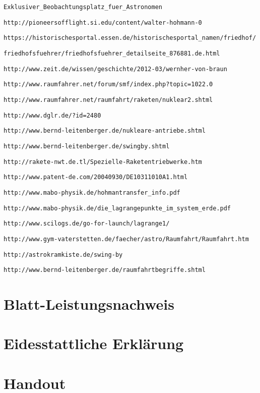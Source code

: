 \documentclass[12pt,a4paper]{article}
\begin{document}
\begin{compactitem}
\verb!Exklusiver_Beobachtungsplatz_fuer_Astronomen!
\item \verb!http://pioneersofflight.si.edu/content/walter-hohmann-0!
\item \verb!https://historischesportal.essen.de/historischesportal_namen/friedhof/!

\verb!friedhofsfuehrer/friedhofsfuehrer_detailseite_876881.de.html!
\item \verb!http://www.zeit.de/wissen/geschichte/2012-03/wernher-von-braun!
\item \verb!http://www.raumfahrer.net/forum/smf/index.php?topic=1022.0!
\item \verb!http://www.raumfahrer.net/raumfahrt/raketen/nuklear2.shtml!
\item \verb!http://www.dglr.de/?id=2480!
\item \verb!http://www.bernd-leitenberger.de/nukleare-antriebe.shtml!
\item \verb!http://www.bernd-leitenberger.de/swingby.shtml!
\item \verb!http://rakete-nwt.de.tl/Spezielle-Raketentriebwerke.htm!
\item \verb!http://www.patent-de.com/20040930/DE10311010A1.html!
\item \verb!http://www.mabo-physik.de/hohmantransfer_info.pdf!
\item \verb!http://www.mabo-physik.de/die_lagrangepunkte_im_system_erde.pdf!
\item \verb!http://www.scilogs.de/go-for-launch/lagrange1/!
\item \verb!http://www.gym-vaterstetten.de/faecher/astro/Raumfahrt/Raumfahrt.htm!
\item \verb!http://astrokramkiste.de/swing-by!
\item \verb!http://www.bernd-leitenberger.de/raumfahrtbegriffe.shtml!
\end{compactitem}
\section{Blatt-Leistungsnachweis}
\newpage
\section{Eidesstattliche Erklärung}
\newpage
\section{Handout}
\end{document}
